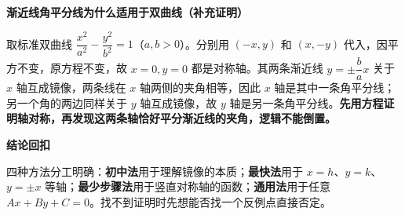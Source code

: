 \begin{proofbox}
\medskip
\textbf{\textcolor{CProof}{渐近线角平分线为什么适用于双曲线（补充证明）}}



取标准双曲线 $\dfrac{x^2}{a^2}-\dfrac{y^2}{b^2}=1$（$a,b>0$）。分别用 $(-x,y)$ 和 $(x,-y)$ 代入，因平方不变，原方程不变，故 $x=0,y=0$ 都是对称轴。其两条渐近线 $y=\pm\dfrac ba x$ 关于 $x$ 轴互成镜像，两条线在 $x$ 轴两侧的夹角相等，因此 $x$ 轴是其中一条角平分线；另一个角的两边同样关于 $y$ 轴互成镜像，故 $y$ 轴是另一条角平分线。\textbf{先用方程证明轴对称，再发现这两条轴恰好平分渐近线的夹角，逻辑不能倒置。}

\medskip
\textbf{\textcolor{CProof}{结论回扣}}

四种方法分工明确：\textbf{初中法}用于理解镜像的本质；\textbf{最快法}用于 $x=h$、$y=k$、$y=\pm x$ 等轴；\textbf{最少步骤法}用于竖直对称轴的函数；\textbf{通用法}用于任意 $Ax+By+C=0$。找不到证明时先想能否找一个反例点直接否定。
\end{proofbox}
